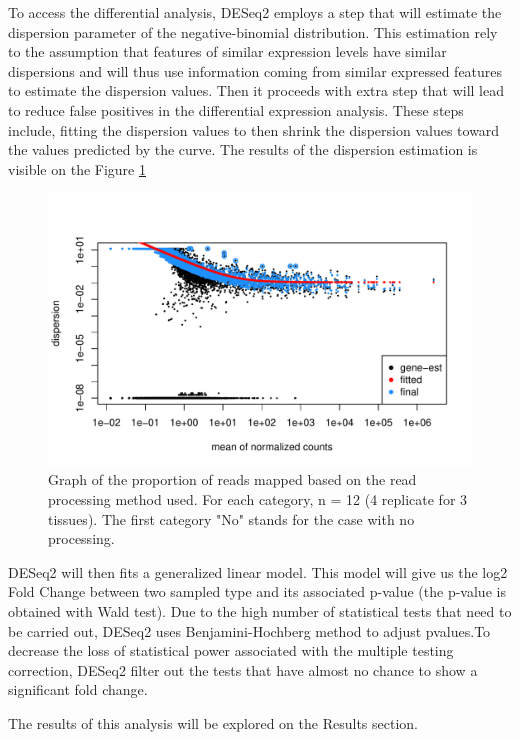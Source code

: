 \documentclass[a4paper, 11pt]{article}
\begin{document}
\begin{multicols}{2}
To access the differential analysis, DESeq2 employs a step that will estimate the dispersion parameter of the negative-binomial distribution. This estimation rely to the assumption that features of similar expression levels have similar dispersions and will thus use information coming from similar expressed features to estimate the dispersion values. Then it proceeds with extra step that will lead to reduce false positives in the differential expression analysis. These steps include, fitting the dispersion values to then shrink the dispersion values toward the values predicted by the curve. The results of the dispersion estimation is visible on the Figure \ref{fig:dispersion}
\begin{figure}[H]
	\centering
	\includegraphics[width=1\columnwidth]{Figures/differential_analysis/dispersion.pdf}
	\caption{\footnotesize{Graph of the proportion of reads mapped based on the read processing method used. For each category, n = 12 (4 replicate for 3 tissues). The first category "No" stands for the case with no processing.}}
	\label{fig:dispersion}
\end{figure}

DESeq2 will then fits a generalized linear model. This model will give us the log2 Fold Change between two sampled type and its associated p-value (the p-value is obtained with Wald test). Due to the high number of statistical tests that need to be carried out, DESeq2 uses Benjamini-Hochberg method to adjust pvalues.To decrease the loss of statistical power associated with the multiple testing correction, DESeq2 filter out the tests that have almost no chance to show a significant fold change. 

The results of this analysis will be explored on the Results section.


\end{multicols}
\end{document}
